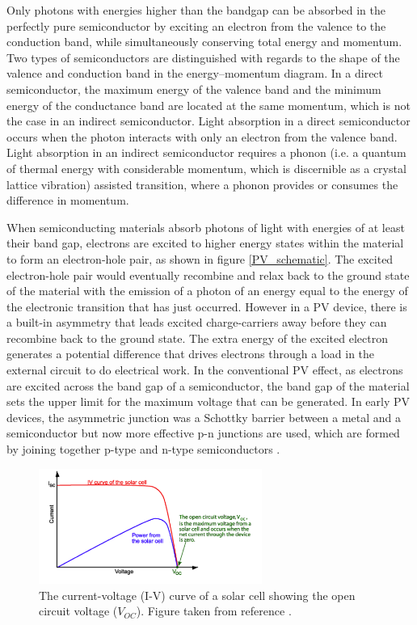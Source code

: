Only photons with energies higher than the bandgap can be absorbed in the
perfectly pure semiconductor by exciting an electron from the valence to the conduction
band, while simultaneously conserving total energy and momentum. Two
types of semiconductors are distinguished with regards to the shape of the valence
and conduction band in the energy–momentum diagram. In a direct semiconductor,
the maximum energy of the valence band and the minimum energy of the conductance
band are located at the same momentum, which is not the case in an indirect
semiconductor. Light absorption in a direct semiconductor occurs when the
photon interacts with only an electron from the valence band. Light absorption
in an indirect semiconductor requires a phonon (i.e. a quantum of thermal energy
with considerable momentum, which is discernible as a crystal lattice vibration)
assisted transition, where a phonon provides or consumes the difference in momentum. \cite{spatial_resolved_book}


When semiconducting materials absorb photons of light with energies of at least their band gap, electrons are excited to higher energy states within the material to 
form an electron-hole pair, as shown in figure \ref{PV_schematic}. The excited electron-hole pair would eventually recombine and relax back 
to the ground state of the material with the emission of a photon of an energy equal to the energy of the 
electronic transition that has just occurred. 
However in a PV device, there is a built-in asymmetry that leads excited charge-carriers away before they can recombine back to the ground state. The extra energy of the excited electron generates a potential difference that drives electrons through a load in the external circuit to 
do electrical work. In the conventional PV effect, as electrons are excited across the band gap of a semiconductor, the band gap of the material sets the upper limit for the maximum voltage that can be generated. In early PV devices, the asymmetric junction was a Schottky barrier between a metal and a 
semiconductor but now more effective p-n junctions are used, which are formed by joining together p-type and n-type semiconductors \cite{Nelson1}. \\

\begin{figure}[h!]
  \centering
    \includegraphics[width=0.65\textwidth]{figures/IV}
    \caption{The current-voltage (I-V) curve of a solar cell showing the open circuit voltage ($V_{OC}$). Figure taken from reference .}
  \label{IV}
\end{figure}

